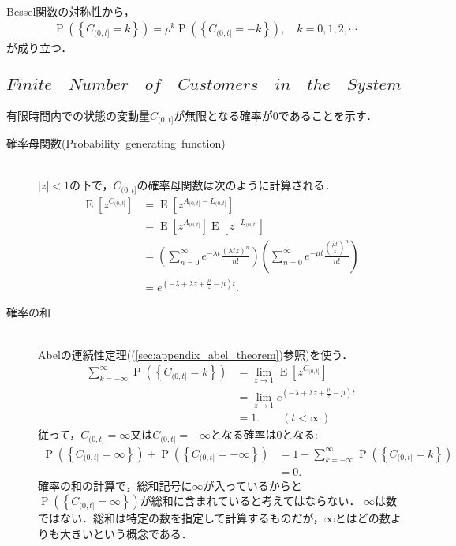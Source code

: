 \documentclass[a4j,papersize,disablejfam,slide,14pt]{jsarticle}
\def\Exp#1{\operatorname{E} \left[ #1 \right]} %
\def\exp#1{e^{#1}} %
\def\prob#1{\operatorname{P} \left(\left\{ #1 \right\}\right)} %
\begin{document}
    \mbox{}\\
    {\rm Bessel}関数の対称性から，
    \begin{align}
    	\prob{C_{(0, t]} = k} = \rho^{k} \prob{C_{(0, t]} = -k}, \quad k=0,1,2,\cdots \label{eq:bessel_symmetry_2}
    \end{align}
    が成り立つ．

\subsection{$Finite\quad Number\quad of\quad Customers\quad in\quad the\quad System$}
	有限時間内での状態の変動量$C_{(0, t]}$が無限となる確率が$0$であることを示す．
    \begin{description}
    	\item[確率母関数{\rm (Probability\ generating\ function)}]\mbox{}\\
        	$|z| < 1$の下で，$C_{(0, t]}$の確率母関数は次のように計算される．
            \begin{align}
            	\Exp{z^{C_{(0, t]}}} &= \Exp{z^{A_{(0, t]} - L_{(0, t]}}} \\
                &= \Exp{z^{A_{(0, t]}}}\Exp{z^{-L_{(0, t]}}} \\
                &= \left(\sum_{n=0}^{\infty} \exp{-\lambda t} \frac{(\lambda t z)^n}{n!} \right)
                	\left(\sum_{n=0}^{\infty} \exp{-\mu t} \frac{(\frac{\mu t}{z})^n}{n!} \right) \\
                &= \exp{(-\lambda + \lambda z + \frac{\mu}{z} -\mu)t}.
            \end{align}
        \item[確率の和]\mbox{}\\
        	{\rm Abel}の連続性定理((\ref{sec:appendix_abel_theorem})参照)を使う．
        	\begin{align}
            	\sum_{k=-\infty}^{\infty} \prob{C_{(0, t]} = k} &= \lim_{z \to 1} \Exp{z^{C_{(0, t]}}} \\
                &= \lim_{z \to 1} \exp{(-\lambda + \lambda z + \frac{\mu}{z} -\mu)t} \\
                &= 1. \qquad (t < \infty) \label{eq:sum_prob_change}
            \end{align}
            従って，$C_{(0, t]} = \infty$又は$C_{(0, t]} = -\infty$となる確率は$0$となる:
            \begin{align}
                \prob{C_{(0, t]} = \infty} + \prob{C_{(0, t]} = -\infty} &= 1 - \sum_{k=-\infty}^{\infty} \prob{C_{(0, t]} = k} \\
                &= 0.
            \end{align}
            確率の和の計算で，総和記号に$\infty$が入っているからと$\prob{C_{(0, t]} = \infty}$が総和に含まれていると考えてはならない．
            $\infty$は数ではない．総和は特定の数を指定して計算するものだが，$\infty$とはどの数よりも大きいという概念である．
    \end{description}
\end{document}
